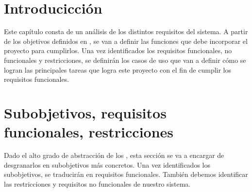 \section{Introducicción}
\begin{text}
	Este capítulo consta de un análisis de los distintos requisitos del sistema. A partir de los objetivos definidos en , se van a definir las funciones que debe incorporar el proyecto para cumplirlos. Una vez identificados los requisitos funcionales, no funcionales y restricciones, se definirán los casos de uso que van a definir cómo se logran las principales tareas que logra este proyecto con el fin de cumplir los requisitos funcionales.
	
\end{text}
\section{Subobjetivos, requisitos funcionales, restricciones}
	\begin{text}
		Dado el alto grado de abstracción de los , esta sección se va a encargar de desgranarlos en subobjetivos más concretos. Una vez identificados los subobjetivos, se traducirán en requisitos funcionales. También debemos identificar las restricciones y requisitos no funcionales de nuestro sistema.
	\end{text}

